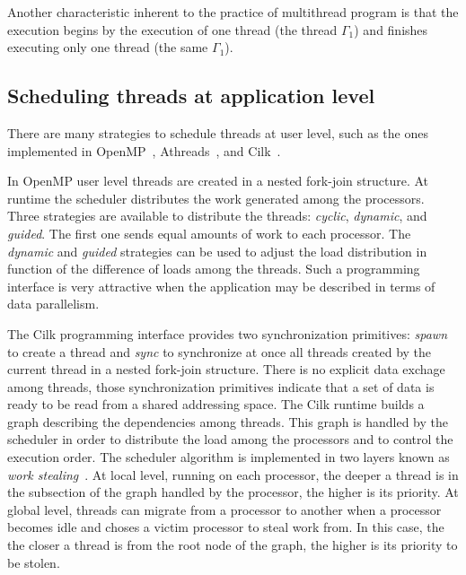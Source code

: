 \documentclass[twocolumn]{svjour3}
\begin{document}
Another characteristic inherent to the practice of multithread program is that the execution begins by the execution of one thread (the thread $\Gamma_1$) and finishes executing only one thread (the same $\Gamma_1$).

\subsection{Scheduling threads at application level}

There are many strategies to schedule threads at user level, such as the ones implemented in OpenMP~\cite{ChandraOpenMP}, Athreads~\cite{Vicosa07}, and Cilk~\cite{Cilk95}.

In OpenMP user level threads are created in a nested fork-join structure. {\color{blue}At runtime the scheduler} distributes the work generated among the processors. Three strategies are available to distribute the threads: \emph{cyclic}, \emph{dynamic}, and \emph{guided}. The first one sends equal amounts of work to each processor. The \emph{dynamic} and \emph{guided} strategies can be used to adjust the load distribution in function of the difference of loads among the threads. Such a programming interface is very attractive when the application may be described in terms of data parallelism.

The Cilk programming interface provides two synchronization primitives: {\em spawn} to create a thread and {\em sync} to synchronize at once all threads created by the current thread in a nested fork-join structure. There is no explicit data exchage among threads, those synchronization primitives indicate that a set of data {\color{blue}is} ready to be read from a shared addressing space. The Cilk runtime builds a graph describing the {\color{blue}dependencies} among threads. This graph is handled by the scheduler in order to distribute the load among the processors and to control the execution order. The scheduler algorithm is implemented in two layers known as \emph{work stealing}~\cite{blumofe1994scheduling}. At local level, running on each processor, the deeper a thread is in the subsection of the graph handled by the processor, the higher is its priority. At global level, threads can migrate from a processor to another when a processor becomes idle and choses a victim processor to steal work from. In this case, the {\color{blue}the closer a thread is from the root node of the} graph, the higher is its priority to be stolen.
\end{document}
